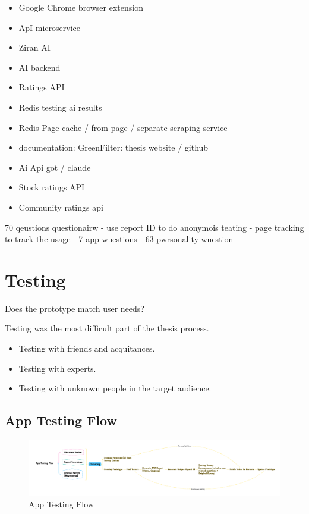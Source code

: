 \documentclass[
  letterpaper,
  DIV=11,
  numbers=noendperiod]{scrartcl}
\begin{document}
\begin{itemize}
\item
  Google Chrome browser extension
\item
  ApI microservice
\item
  Ziran AI
\item
  AI backend
\item
  Ratings API
\item
  Redis testing ai results
\item
  Redis Page cache / from page / separate scraping service
\item
  documentation: GreenFilter: thesis website / github
\item
  Ai Api got / claude
\item
  Stock ratings API
\item
  Community ratings api
\end{itemize}

70 qeustions questionairw - use report ID to do anonymois teating - page
tracking to track the usage - 7 app wuestions - 63 pwrsonality wuestion

\newpage

\section{Testing}\label{testing-1}

Does the prototype match user needs?

Testing was the most difficult part of the thesis process.

\begin{itemize}
\item
  Testing with friends and acquitances.
\item
  Testing with experts.
\item
  Testing with unknown people in the target audience.
\end{itemize}

\subsection{App Testing Flow}\label{app-testing-flow}

\begin{figure}[H]

{\centering \includegraphics[width=1\textwidth,height=\textheight]{./images/testing/app-testing-flow.png}

}

\caption{App Testing Flow}

\end{figure}%
\end{document}

